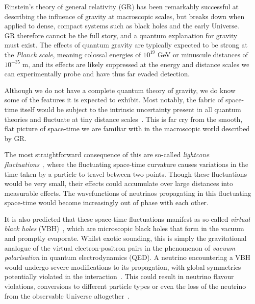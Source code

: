 \documentclass[a4paper,11pt]{article}
\begin{document}
Einstein's theory of general relativity (GR) has been remarkably successful at describing the influence of gravity at macroscopic scales, but breaks down when applied to dense, compact systems such as black holes and the early Universe. GR therefore cannot be the full story, and a quantum explanation for gravity must exist. The effects of quantum gravity are typically expected to be strong at the \textit{Planck scale}, meaning colossal energies of $10^{19}$ GeV or minuscule distances of $10^{-35}$ m, and its effects are likely suppressed at the energy and distance scales we can experimentally probe and have thus far evaded detection.


Although we do not have a complete quantum theory of gravity, we do know some of the features it is expected to exhibit. Most notably, the fabric of space-time itself would be subject to the intrinsic uncertainty present in all quantum theories and fluctuate at tiny distance scales~\cite{PhysRev.97.511, Hawking}. This is far cry from the smooth, flat picture of space-time we are familiar with in the macroscopic world described by GR. 

The most straightforward consequence of this are so-called \textit{lightcone fluctuations}~\cite{PauliLightcone, Ford1999, gr-qc/9909085, Ellis:1999jf}, where the fluctuating space-time curvature causes variations in the time taken by a particle to travel between two points. Though these fluctuations would be very small, their effects could accumulate over large distances into measurable effects. The wavefunctions of neutrinos propagating in this fluctuating space-time would become increasingly out of phase with each other.

It is also predicted that these space-time fluctuations manifest as so-called \textit{virtual black holes} (VBH)~\cite{Hawking1982,PhysRevD.53.3099}, which are microscopic black holes that form in the vacuum and promptly evaporate. Whilst exotic sounding, this is simply the gravitational analogue of the virtual electron-positron pairs in  the phenomenon of \textit{vacuum polarisation} in quantum electrodynamics (QED). A neutrino encountering a VBH would undergo severe modifications to its propagation, with global symmetries potentially violated in the interaction~\cite{Anchordoqui:2005gj, Harlow:2018jwu, PhysRevD.102.115003, Hellmann:2021jyz}. This could result in neutrino flavour violations, conversions to different particle types or even the loss of the neutrino from the observable Universe altogether~\cite{Anchordoqui:2005gj, Anchordoqui:2006xv, Witten:2017hdv}.
\end{document}
